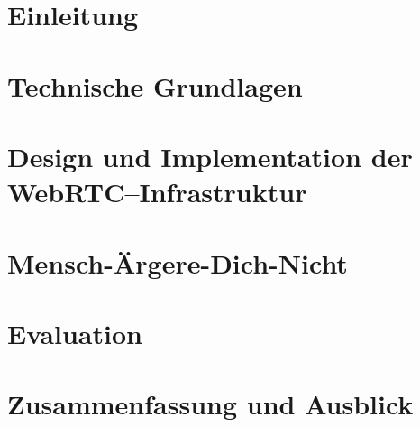 \documentclass[oneside,12pt,a4paper,bibliography=totocnumbered,numbers=noenddot]{scrreprt}
\begin{document}
\chapter{Einleitung}


\chapter{Technische Grundlagen}


\chapter{Design und Implementation der WebRTC--Infrastruktur}


\chapter{Mensch-Ärgere-Dich-Nicht}


\chapter{Evaluation}
%
\chapter{Zusammenfassung und Ausblick}
%

%



\clearpage

\end{document}

